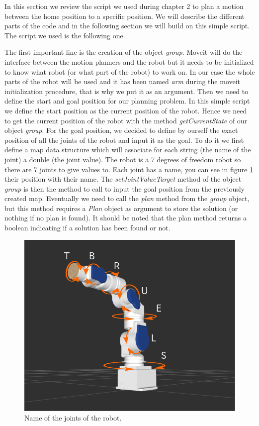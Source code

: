 In this section we review the script we used during chapter 2 to plan a motion between the home position to a specific position. We will describe the different parts of the code and in the following section we will build on this simple script. The script we used is the following one.



The first important line is the creation of the object \emph{group}. Moveit will do the interface between the motion planners and the robot but it needs to be initialized to know what robot (or what part of the robot) to work on. In our case the whole parts of the robot will be used and it has been named \emph{arm} during the moveit initialization procedure, that is why we put it as an argument. Then we need to define the start and goal position for our planning problem. In this simple script we define the start position as the current position of the robot. Hence we need to get the current position of the robot with the method \emph{getCurrentState} of our object \emph{group}. For the goal position, we decided to define by ourself the exact position of all the joints of the robot and input it as the goal. To do it we first define a map data structure which will associate for each string (the name of the joint) a double (the joint value). The robot is a 7 degrees of freedom robot so there are 7 joints to give values to. Each joint has a name, you can see in figure \ref{fig:sia5_joints_name} their position with their name. The \emph{setJointValueTarget} method of the object \emph{group} is then the method to call to input the goal position from the previously created map. Eventually we need to call the \emph{plan} method from the \emph{group} object, but this method requires a \emph{Plan} object as argument to store the solution (or nothing if no plan is found). It should be noted that the plan method returns a boolean indicating if a solution has been found or not.

\begin{figure}[ht]
\includegraphics[scale=0.49]{images/motion_planning/robot_model.png}
\centering
\caption{Name of the joints of the robot.}
\label{fig:sia5_joints_name}
\end{figure}

